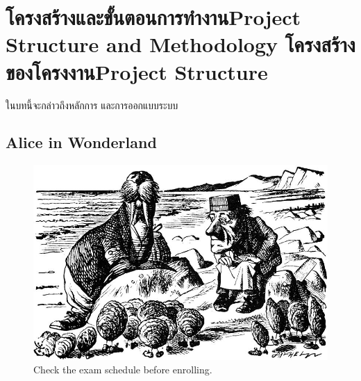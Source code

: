 \chapter{\ifproject%
\ifcpe โครงสร้างและขั้นตอนการทำงาน\else Project Structure and Methodology\fi
\else%
\ifcpe โครงสร้างของโครงงาน\else Project Structure\fi
\fi
}

ในบทนี้จะกล่าวถึงหลักการ และการออกแบบระบบ

\makeatletter


\makeatother

\section{Alice in Wonderland}

\begin{figure}
\begin{center}
\includegraphics{800px-Briny_Beach.jpg}
\end{center}
\caption[Poem]{Check the exam schedule before enrolling.}
\label{fig:walrus}
\end{figure}

